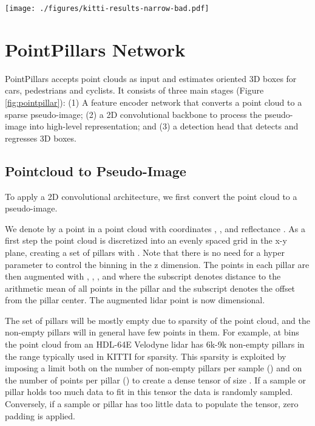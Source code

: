 \documentclass[10pt,twocolumn,letterpaper]{article}
\newcommand{\figref}[1]{Figure \ref{#1}}
\newcommand{\squeeze}{\vspace{-0.5mm}}
\begin{document}
\begin{figure*}
\begin{center}
\texttt{[image: ./figures/kitti-results-narrow-bad.pdf]}
\end{center}
\caption{Failure cases on KITTI.
Same visualize setup from \figref{fig:kitti_visualize} but focusing on several common failure modes.
}
\label{fig:kitti_failure}
\end{figure*}

\section{PointPillars Network} \label{sec:network}
\squeeze

PointPillars accepts point clouds as input and estimates oriented 3D boxes for cars, pedestrians and cyclists.
It consists of three main stages (\figref{fig:pointpillar}):
(1) A feature encoder network that converts a point cloud to a sparse pseudo-image;
(2) a 2D convolutional backbone to process the pseudo-image into high-level representation; and
(3) a detection head that detects and regresses 3D boxes.

\subsection{Pointcloud to Pseudo-Image}
\label{sec:pointpillars}
\label{sec:create-stacked-pillars}
To apply a 2D convolutional architecture, we first convert the point cloud to a pseudo-image.

We denote by  a point in a point cloud with coordinates , ,  and reflectance .
As a first step the point cloud is discretized into an evenly spaced grid in the x-y plane, creating a set of pillars  with .
Note that there is no need for a hyper parameter to control the binning in the z dimension.
The points in each pillar are then augmented with , , ,  and  where the  subscript denotes distance to the arithmetic mean of all points in the pillar and the  subscript denotes the offset from the pillar  center. The augmented lidar point  is now  dimensional.

The set of pillars will be mostly empty due to sparsity of the point cloud, and the non-empty pillars will in general have few points in them.
For example, at  bins the point cloud from an HDL-64E Velodyne lidar has 6k-9k non-empty pillars in the range typically used in KITTI for  sparsity.
This sparsity is exploited by imposing a limit both on the number of non-empty pillars per sample () and on the number of points per pillar () to create a dense tensor of size . 
If a sample or pillar holds too much data to fit in this tensor the data is randomly sampled. 
Conversely, if a sample or pillar has too little data to populate the tensor, zero padding is applied.
\end{document}
